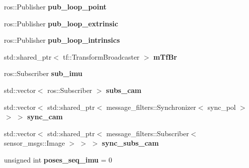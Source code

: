 \begin{DoxyCompactItemize}
ros\+::\+Publisher {\bfseries pub\+\_\+loop\+\_\+point}
\item 
\mbox{\label{classov__msckf_1_1ROS1Visualizer_a198424e20b3385f83a48625897b09cb6}} 
ros\+::\+Publisher {\bfseries pub\+\_\+loop\+\_\+extrinsic}
\item 
\mbox{\label{classov__msckf_1_1ROS1Visualizer_a495b2605a5de931f99a5b09e2cdc5457}} 
ros\+::\+Publisher {\bfseries pub\+\_\+loop\+\_\+intrinsics}
\item 
\mbox{\label{classov__msckf_1_1ROS1Visualizer_a07871749e8a3e09ba964eef8d7b83042}} 
std\+::shared\+\_\+ptr$<$ tf\+::\+Transform\+Broadcaster $>$ {\bfseries m\+Tf\+Br}
\item 
\mbox{\label{classov__msckf_1_1ROS1Visualizer_a3bbd24e0165f2385bf95517ff5f570a9}} 
ros\+::\+Subscriber {\bfseries sub\+\_\+imu}
\item 
\mbox{\label{classov__msckf_1_1ROS1Visualizer_ab728f057db9c735e89375e1548b52ef9}} 
std\+::vector$<$ ros\+::\+Subscriber $>$ {\bfseries subs\+\_\+cam}
\item 
\mbox{\label{classov__msckf_1_1ROS1Visualizer_a7d2dde3648aa2d897232a51cbedb6c06}} 
std\+::vector$<$ std\+::shared\+\_\+ptr$<$ message\+\_\+filters\+::\+Synchronizer$<$ sync\+\_\+pol $>$ $>$ $>$ {\bfseries sync\+\_\+cam}
\item 
\mbox{\label{classov__msckf_1_1ROS1Visualizer_a35e23b69f42e025fa491ea7ccc1c1cfa}} 
std\+::vector$<$ std\+::shared\+\_\+ptr$<$ message\+\_\+filters\+::\+Subscriber$<$ sensor\+\_\+msgs\+::\+Image $>$ $>$ $>$ {\bfseries sync\+\_\+subs\+\_\+cam}
\item 
\mbox{\label{classov__msckf_1_1ROS1Visualizer_a81194424d5ad506b6060ab8855a96a1c}} 
unsigned int {\bfseries poses\+\_\+seq\+\_\+imu} = 0
\item 
\mbox{\label{classov__msckf_1_1ROS1Visualizer_a656eda0c80b2f1b3845785132a23135f}} 

\end{DoxyCompactItemize}
